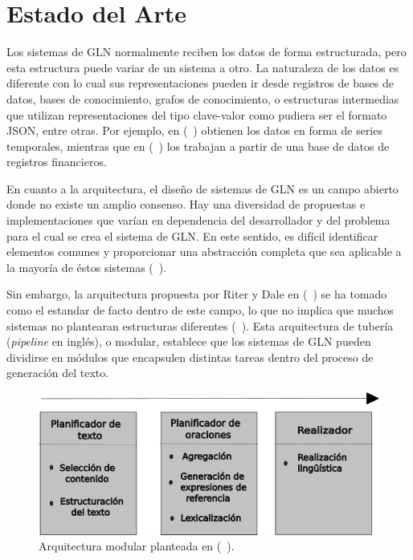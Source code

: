 \chapter{Estado del Arte}\label{chapter:state-of-the-art}


    Los sistemas de GLN normalmente reciben los datos de forma estructurada, pero esta estructura puede variar de un sistema a otro.
La naturaleza de los datos es diferente con lo cual sus representaciones pueden ir desde registros de bases de datos, bases de conocimiento, 
grafos de conocimiento, o estructuras intermedias que utilizan representaciones del tipo clave-valor como pudiera ser el formato JSON, entre otras. 
Por ejemplo, en (~\cite{Yu2006ChoosingTC}) obtienen los datos en forma de series temporales, mientras que en (~\cite{kukich1983design}) los trabajan a 
partir de una base de datos de registros financieros.

En cuanto a la arquitectura, el diseño de sistemas de GLN es un campo abierto donde no existe un amplio consenso. Hay una diversidad de propuestas e implementaciones 
que varían en dependencia del desarrollador y del problema para el cual se crea el sistema de GLN. En este sentido, es difícil identificar elementos comunes y proporcionar una abstracción 
completa que sea aplicable a la mayoría de éstos sistemas (~\cite{ramos2016role}).


 Sin embargo, la arquitectura propuesta por Riter y Dale en (~\cite{Reiter1997BuildingAN}) se ha tomado como el estandar de facto 
dentro de este campo, lo que no implica que muchos sistemas no plantearan estructuras diferentes (~\cite{Perera2017RecentAI}). 
Esta arquitectura de tubería (\emph{pipeline} en inglés), o modular, establece que los sistemas de GLN pueden dividirse en módulos 
que encapsulen distintas tareas dentro del proceso de generación del texto.

    

    \begin{figure}[!]
        \begin{center}
            \includegraphics[width=\textwidth]{Graphics/arquitecturaPipeline_Capa 1.png}
        \end{center}
        \caption{Arquitectura modular planteada en (~\cite{Reiter1997BuildingAN}).}
        \label{fig_arq_Pipeline}
    \end{figure}


